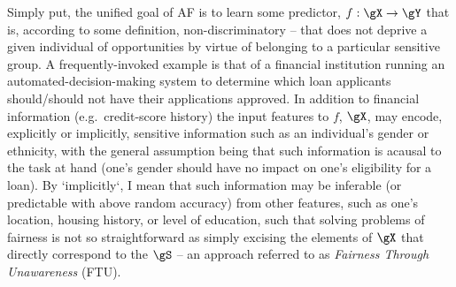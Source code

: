 %
Simply put, the unified goal of \ac{AF} is to learn some predictor, \(f: \gX \to \gY \) that is,
according to some definition, non-discriminatory -- that does not deprive a given individual of
opportunities by virtue of belonging to a particular sensitive group.
%
A frequently-invoked example is that of a financial institution running an
automated-decision-making system to determine which loan applicants should/should not have their
applications approved.
%
In addition to financial information (e.g.\ credit-score history) the input features to \(f\),
\(\gX\), may encode, explicitly or implicitly, sensitive information such as an individual's gender
or ethnicity, with the general assumption being that such information is acausal to the task at
hand (one's gender should have no impact on one's eligibility for a loan).
%
By `implicitly`, I mean that such information may be inferable (or predictable with above random
accuracy) from other features, such as one's location, housing history, or level of education, such
that solving problems of fairness is not so straightforward as simply excising the elements of
\(\gX\) that directly correspond to the \(\gS\) -- an approach referred to as \emph{Fairness
Through Unawareness} (FTU).
%

